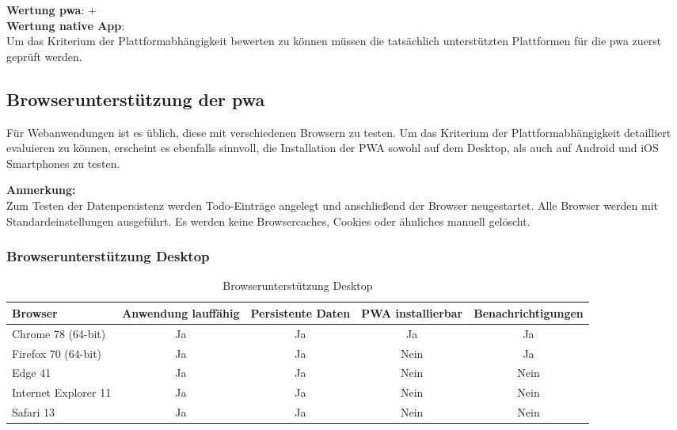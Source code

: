 \textbf{Wertung \ac{pwa}}: $+$ \\
\textbf{Wertung native App}:  \\

Um das Kriterium der Plattformabhängigkeit bewerten zu können müssen die tatsächlich unterstützten Plattformen für die \ac{pwa} zuerst geprüft werden.

\subsection{Browserunterstützung der \acs{pwa}}
Für Webanwendungen ist es üblich, diese mit verschiedenen Browsern zu testen. Um das Kriterium der Plattformabhängigkeit detailliert evaluieren zu können, erscheint es ebenfalls sinnvoll, die Installation der PWA sowohl auf dem Desktop, als auch auf Android und iOS Smartphones zu testen.

\textbf{Anmerkung:}\\
Zum Testen der Datenpersistenz werden Todo-Einträge angelegt und anschließend der Browser neugestartet.
Alle Browser werden mit Standardeinstellungen ausgeführt. Es werden keine Browsercaches, Cookies oder ähnliches manuell gelöscht.

\subsubsection{Browserunterstützung Desktop}
\begin{table}[H]
	\centering
	\begin{tabularx}{\textwidth}{|l||C|C|C|c|}
		\hline
		Browser              & Anwendung lauffähig & Persistente Daten & PWA installierbar & Benachrichtigungen \\
		\hline
		Chrome 78 (64-bit)   & Ja                  & Ja                & Ja                & Ja                 \\
		Firefox 70 (64-bit)  & Ja                  & Ja                & Nein              & Ja                 \\
		Edge 41    & Ja                  & Ja                & Nein              & Nein               \\
		Internet Explorer 11 & Ja                  & Ja                & Nein              & Nein               \\
		Safari 13            & Ja                  & Ja                & Nein              & Nein               \\
		\hline
	\end{tabularx}
	\caption{Browserunterstützung Desktop} \label{tab:browser_desktop}
\end{table}

